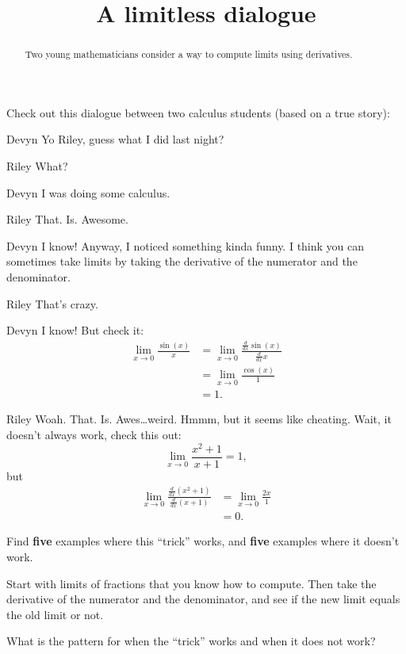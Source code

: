 \documentclass{ximera}
\title[Break-Ground:]{A limitless dialogue}
\begin{document}
\begin{abstract}
Two young mathematicians consider a way to compute limits using derivatives.
\end{abstract}
\maketitle

Check out this dialogue between two calculus students (based on a true
story):

\begin{dialogue}
\item[Devyn] Yo Riley, guess what I did last night?
\item[Riley] What?
\item[Devyn] I was doing some calculus.
\item[Riley] That. Is. Awesome.
\item[Devyn] I know! Anyway, I noticed something kinda funny. I
  think you can sometimes take limits by taking the derivative of the
  numerator and the denominator.
\item[Riley] That's crazy.
\item[Devyn] I know! But check it:
  \begin{align*}
    \lim_{x\to 0} \frac{\sin(x)}{x} &= \lim_{x\to 0} \frac{\frac{d}{dx}\sin(x)}{\frac{d}{dx} x}\\
    &= \lim_{x\to 0} \frac{\cos(x)}{1}\\
    &=1.
  \end{align*}
  \item[Riley] Woah. That. Is. Awes\dots weird. Hmmm, but it seems like
    cheating. Wait, it doesn't always work, check this out:
    \[
    \lim_{x\to 0} \frac{x^2+1}{x+1} = 1,
    \]
    but
    \begin{align*}
      \lim_{x\to 0} \frac{\frac{d}{dx}\left(x^2+1\right)}{\frac{d}{dx}\left(x+1\right)} &=
      \lim_{x\to 0} \frac{2x}{1} \\
      &=0.
    \end{align*}
\end{dialogue}

\begin{problem}
  Find \textbf{five} examples where this ``trick'' works, and
  \textbf{five} examples where it doesn't work.
  \begin{hint}
    Start with limits of fractions that you know how to compute. Then
    take the derivative of the numerator and the denominator, and see
    if the new limit equals the old limit or not.
  \end{hint}
  \begin{freeResponse}
  \end{freeResponse}
\end{problem}

\begin{problem}
  What is the pattern for when the ``trick'' works and when it does not work?
  \begin{freeResponse}
\end{freeResponse}
\end{problem}

%
\end{document}
